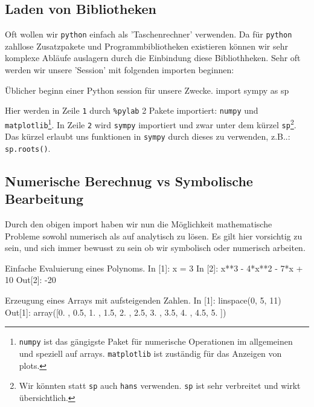 \subsection{Laden von Bibliotheken}
Oft wollen wir \texttt{python} einfach als 'Taschenrechner' verwenden. Da für \texttt{python} zahllose Zusatzpakete und Programmbibliotheken existieren können wir sehr komplexe Abläufe auslagern durch die Einbindung diese Bibliothheken. Sehr oft werden wir unsere 'Session' mit folgenden importen beginnen:

\begin{python}{Üblicher beginn einer Python session für unsere Zwecke.}
import sympy as sp
\end{python}
Hier werden in Zeile \texttt{1} durch \texttt{\%pylab} 2 Pakete importiert: \texttt{numpy} und \texttt{matplotlib}\footnote{\texttt{numpy} ist das gängigste Paket für numerische Operationen im allgemeinen und speziell auf arrays. \texttt{matplotlib} ist zuständig für das Anzeigen von plots.}. In Zeile \texttt{2} wird \texttt{sympy} importiert und zwar unter dem kürzel \texttt{sp}\footnote{Wir könnten statt \texttt{sp} auch \texttt{hans} verwenden. \texttt{sp} ist sehr verbreitet und wirkt übersichtlich.}. Das kürzel erlaubt uns funktionen in \texttt{sympy} durch dieses zu verwenden, z.B..: \texttt{sp.roots()}. \\


\subsection{Numerische Berechnug vs Symbolische Bearbeitung}

Durch den obigen import haben wir nun die Möglichkeit mathematische Probleme sowohl numerisch als auf analytisch zu lösen. Es gilt hier vorsichtig zu sein, und sich immer bewusst zu sein ob wir symbolisch oder numerisch arbeiten. 


\begin{python}{Einfache Evaluierung eines Polynoms.}
In [1]: x = 3
In [2]: x**3 - 4*x**2 - 7*x + 10
Out[2]: -20
\end{python}
\begin{python}{Erzeugung eines Arrays mit aufsteigenden Zahlen.}
In [1]: linspace(0, 5, 11)
Out[1]: array([0. , 0.5, 1. , 1.5, 2. , 2.5, 3. , 3.5, 4. , 4.5, 5. ])
\end{python}

